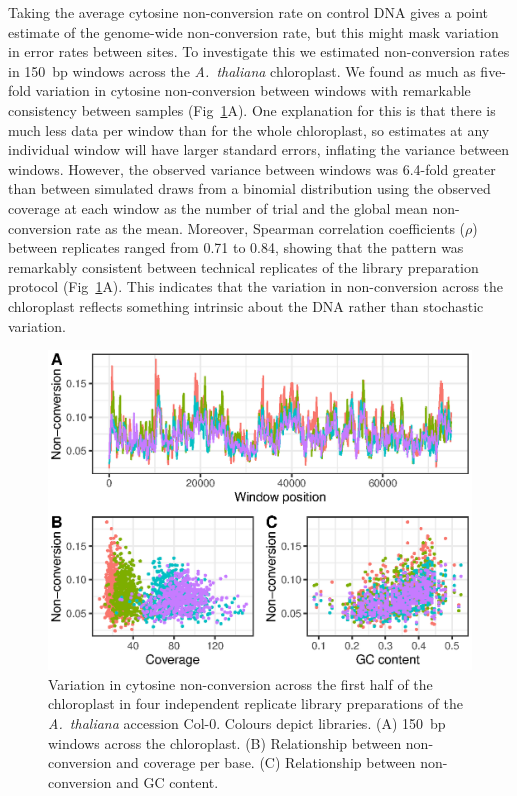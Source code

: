 \documentclass[10pt,letterpaper]{article}
\begin{document}
Taking the average cytosine non-conversion rate on control DNA gives a point estimate of the genome-wide non-conversion rate, but this might mask variation in error rates between sites.
To investigate this we estimated non-conversion rates in 150~bp windows across the \emph{A.~thaliana} chloroplast.
We found as much as five-fold variation in cytosine non-conversion between windows with remarkable consistency between samples (Fig~\ref{fig:uncertainty}A).
One explanation for this is that there is much less data per window than for the whole chloroplast, so estimates at any individual window will have larger standard errors, inflating the variance between windows.
However, the observed variance between windows was 6.4-fold greater than between simulated draws from a binomial distribution using the observed coverage at each window as the number of trial and the global mean non-conversion rate as the mean.
Moreover, Spearman correlation coefficients ($\rho$) between replicates ranged from 0.71 to 0.84, showing that the pattern was remarkably consistent between technical replicates of the library preparation protocol (Fig~\ref{fig:uncertainty}A).
This indicates that the variation in non-conversion across the chloroplast reflects something intrinsic about the DNA rather than stochastic variation.

\begin{figure}
  \begin{center}
    \includegraphics{figure2.eps}
    \caption{
        Variation in cytosine non-conversion across the first half of the chloroplast in four independent replicate library preparations of the \emph{A.~thaliana} accession Col-0. Colours depict libraries.
        (A) 150~bp windows across the chloroplast.
        (B) Relationship between non-conversion and coverage per base.
        (C) Relationship between non-conversion and GC content.
    }
    \label{fig:uncertainty}
  \end{center}
\end{figure}
\end{document}
